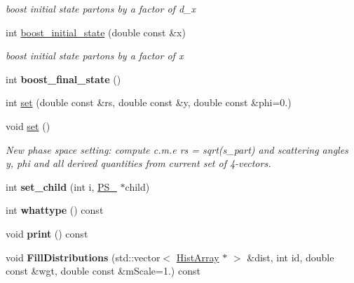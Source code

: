 \begin{DoxyCompactItemize}
\begin{DoxyCompactList}\small\item\em boost initial state partons by a factor of d\-\_\-x \end{DoxyCompactList}\item 
\hypertarget{classPS__2__2_abdf4c563c0c67169a478fb7719581a35}{int \hyperlink{classPS__2__2_abdf4c563c0c67169a478fb7719581a35}{boost\-\_\-initial\-\_\-state} (double const \&x)}\label{classPS__2__2_abdf4c563c0c67169a478fb7719581a35}

\begin{DoxyCompactList}\small\item\em boost initial state partons by a factor of x \end{DoxyCompactList}\item 
\hypertarget{classPS__2__2_a397211db7a5b9781886cc55dae1d23d3}{int {\bfseries boost\-\_\-final\-\_\-state} ()}\label{classPS__2__2_a397211db7a5b9781886cc55dae1d23d3}

\item 
int \hyperlink{classPS__2__2_add28db38c9779539849ecb4384432911}{set} (double const \&rs, double const \&y, double const \&phi=0.)
\item 
\hypertarget{classPS__2__2_ab111a119760dc14b3ae5cb40dbec0c49}{void \hyperlink{classPS__2__2_ab111a119760dc14b3ae5cb40dbec0c49}{set} ()}\label{classPS__2__2_ab111a119760dc14b3ae5cb40dbec0c49}

\begin{DoxyCompactList}\small\item\em New phase space setting\-: compute c.\-m.\-e rs = sqrt(s\-\_\-part) and scattering angles y, phi and all derived quantities from current set of 4-\/vectors. \end{DoxyCompactList}\item 
\hypertarget{classPS__2__2_a7ed4acdee85fea6b129aa9801cb8d3c7}{int {\bfseries set\-\_\-child} (int i, \hyperlink{classPS__2}{P\-S\-\_} $\ast$child)}\label{classPS__2__2_a7ed4acdee85fea6b129aa9801cb8d3c7}

\item 
\hypertarget{classPS__2__2_a27ba82e9c32ba391be7df643181de646}{int {\bfseries whattype} () const }\label{classPS__2__2_a27ba82e9c32ba391be7df643181de646}

\item 
\hypertarget{classPS__2__2_af19d44fe30fb72ccfc20f5626f04dcdc}{void {\bfseries print} () const }\label{classPS__2__2_af19d44fe30fb72ccfc20f5626f04dcdc}

\item 
\hypertarget{classPS__2__2_a26dcd5fa53806a09268b7573b0b97cb8}{void {\bfseries Fill\-Distributions} (std\-::vector$<$ \hyperlink{classHistArray}{Hist\-Array} $\ast$ $>$ \&dist, int id, double const \&wgt, double const \&m\-Scale=1.) const }\label{classPS__2__2_a26dcd5fa53806a09268b7573b0b97cb8}

\end{DoxyCompactItemize}
